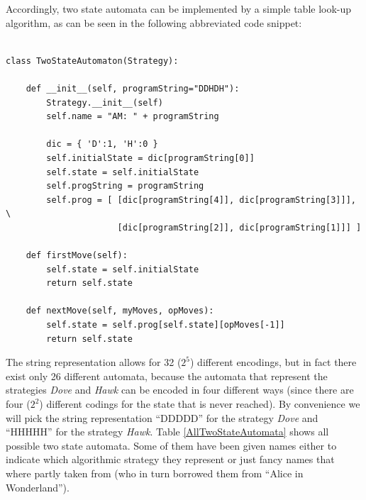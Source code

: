 Accordingly, two state automata can be implemented by a simple table look-up
algorithm, as can be seen in the following abbreviated code snippet:

\begin{scriptsize}
\begin{verbatim}

class TwoStateAutomaton(Strategy):

    def __init__(self, programString="DDHDH"):
        Strategy.__init__(self)
        self.name = "AM: " + programString

        dic = { 'D':1, 'H':0 }
        self.initialState = dic[programString[0]]
        self.state = self.initialState
        self.progString = programString
        self.prog = [ [dic[programString[4]], dic[programString[3]]], \
                      [dic[programString[2]], dic[programString[1]]] ]

    def firstMove(self):
        self.state = self.initialState
        return self.state

    def nextMove(self, myMoves, opMoves):
        self.state = self.prog[self.state][opMoves[-1]]
        return self.state

\end{verbatim}
\end{scriptsize}

The string representation allows for 32 ($2^5$) different encodings,
but in fact there exist only 26 different automata, because the
automata that represent the strategies {\em Dove} and {\em Hawk} can
be encoded in four different ways (since there are four ($2^2$)
different codings for the state that is never reached). By convenience
we will pick the string representation ``DDDDD'' for the strategy
{\em Dove} and ``HHHHH'' for the strategy {\em Hawk}. Table
\ref{AllTwoStateAutomata} shows all possible two state automata. Some
of them have been given names either to indicate which algorithmic
strategy they represent or just fancy names that where partly taken from
\cite[p. 296]{binmore:1998} (who in turn borrowed them from ``Alice in
Wonderland'').

